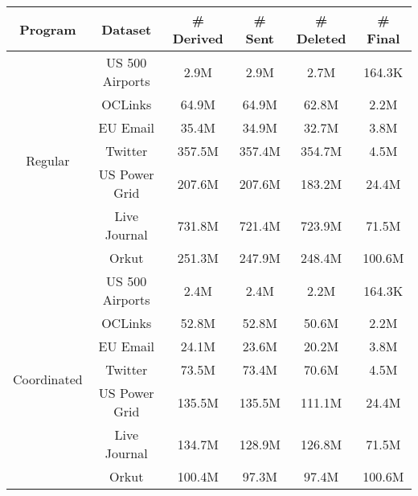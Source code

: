 \begin{tabular}{c | c || c | c | c | c} \hline
	\textbf{Program} & \textbf{Dataset} & \textbf{\# Derived} & \textbf{\# Sent} & \textbf{\# Deleted} & \textbf{\# Final} \\ \hline \hline
\multirow{7}{*}{Regular}  & US 500 Airports & 2.9M & 2.9M & 2.7M & 164.3K \\
 & OCLinks & 64.9M & 64.9M & 62.8M & 2.2M \\
 & EU Email & 35.4M & 34.9M & 32.7M & 3.8M \\
 & Twitter & 357.5M & 357.4M & 354.7M & 4.5M \\
 & US Power Grid & 207.6M & 207.6M & 183.2M & 24.4M \\
 & Live Journal & 731.8M & 721.4M & 723.9M & 71.5M \\
 & Orkut & 251.3M & 247.9M & 248.4M & 100.6M \\
	\hline
\multirow{7}{*}{Coordinated}  & US 500 Airports & 2.4M & 2.4M & 2.2M & 164.3K \\
 & OCLinks & 52.8M & 52.8M & 50.6M & 2.2M \\
 & EU Email & 24.1M & 23.6M & 20.2M & 3.8M \\
 & Twitter & 73.5M & 73.4M & 70.6M & 4.5M \\
 & US Power Grid & 135.5M & 135.5M & 111.1M & 24.4M \\
 & Live Journal & 134.7M & 128.9M & 126.8M & 71.5M \\
 & Orkut & 100.4M & 97.3M & 97.4M & 100.6M \\
	\hline
\end{tabular}
